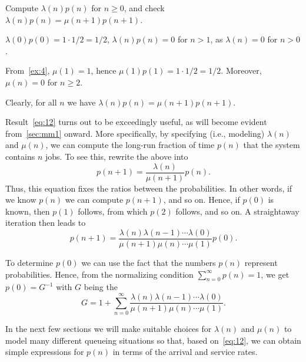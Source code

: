 \begin{exercise}
 Compute $\lambda(n) p(n)$ for $n\geq 0$, and check $\lambda(n) p(n) = \mu(n+1) p(n+1)$.
\begin{solution}
 $\lambda(0)p(0)=1\cdot 1/2 = 1/2$, $\lambda(n)p(n)= 0$ for $n>1$, as $\lambda(n)=0$ for $n>0$.

From~\cref{ex:4}, $\mu(1)=1$, hence $\mu(1) p(1) = 1\cdot 1/2 = 1/2$. Moreover, $\mu(n)=0$ for $n\geq 2$. 

Clearly, for all $n$ we have $\lambda(n)p(n)= \mu(n+1)p(n+1)$. 

\end{solution}
\end{exercise}

Result~\cref{eq:12} turns out to be exceedingly useful, as will become evident from~\cref{sec:mm1} onward.
More specifically, by specifying (i.e., modeling) $\lambda(n)$ and $\mu(n)$, we can compute the long-run fraction of time $p(n)$ that the system contains $n$ jobs.
To see this, rewrite the above into
\begin{equation}\label{eq:25}
 p(n+1) = \frac{\lambda(n)}{\mu(n+1)}p(n). 
\end{equation}
Thus, this equation fixes the ratios between the probabilities. In other words, if we know $p(n)$ we can compute $p(n+1)$, and so on. Hence, if $p(0)$ is known, then $p(1)$ follows, from which $p(2)$
follows, and so on. A straightaway iteration then leads to
\begin{equation}\label{eq:38}
 p(n+1) = \frac{\lambda(n)\lambda(n-1)\cdots \lambda(0)}{\mu(n+1)\mu(n)\cdots \mu(1)}p(0).
\end{equation}

To determine $p(0)$ we can use the fact that the numbers $p(n)$ represent probabilities.
Hence, from the normalizing condition $\sum_{n=0}^\infty p(n)=1$, we get $p(0) = G^{-1}$ with
$G$ being the 
\begin{equation}
 \label{eq:20}
G = 1+\sum_{n=0}^\infty \frac{\lambda(n)\lambda(n-1)\cdots\lambda(0)}{\mu(n+1)\mu(n)\cdots \mu(1)}.
\end{equation}

In the next few sections we will make suitable choices for $\lambda(n)$ and $\mu(n)$ to model many different queueing situations so that, based on~\cref{eq:12}, we can obtain simple expressions for $p(n)$ in terms of the arrival and service rates.

